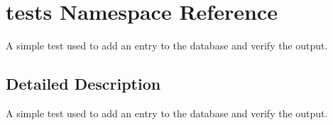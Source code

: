 \hypertarget{namespacetests}{\section{tests Namespace Reference}
\label{namespacetests}
}


A simple test used to add an entry to the database and verify the output.  




\subsection{Detailed Description}
A simple test used to add an entry to the database and verify the output. 
